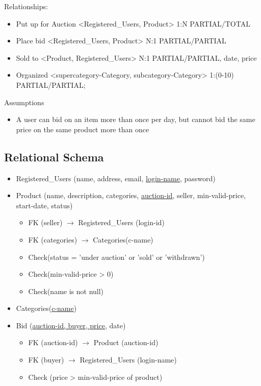 \documentclass[a4paper]{article}
\begin{document}
\noindent
Relationships:
\begin{itemize}
    \item Put up for Auction <Registered\_Users, Product> 1:N PARTIAL/TOTAL
    \item Place bid <Registered\_Users, Product> N:1 PARTIAL/PARTIAL
    \item Sold to <Product, Registered\_Users> N:1 PARTIAL/PARTIAL, date, price
    \item Organized <supercategory-Category, subcategory-Category> 1:(0-10) PARTIAL/PARTIAL;
\end{itemize}

\noindent
Assumptions
\begin{itemize}
    \item A user can bid on an item more than once per day, but cannot bid the same price on the same product more than once
\end{itemize}

\subsection{Relational Schema}

\begin{itemize}
    \item Registered\_Users (name, address, email, \underline{login-name}, password)
    \item Product (name, description, categories, \underline{auction-id}, seller, min-valid-price, start-date, status)
    \begin{itemize}
        \item FK (seller) $\rightarrow$ Registered\_Users (login-id)
        \item FK (categories) $\rightarrow$ Categories(c-name)
        \item Check(status = 'under auction' or 'sold' or 'withdrawn')
        \item Check(min-valid-price > 0)
        \item Check(name is not null)
    \end{itemize}
    \item Categories(\underline{c-name})
    \item Bid (\underline{auction-id, buyer, price}, date)
    \begin{itemize}
        \item FK (auction-id) $\rightarrow$ Product (auction-id)
        \item FK (buyer) $\rightarrow$ Registered\_Users (login-name)
        \item Check (price > min-valid-price of product)
    \end{itemize}
\end{itemize}
\end{document}
